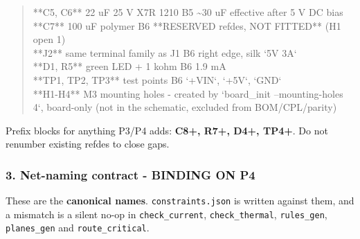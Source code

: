 \documentclass[11pt,a4paper]{article}
\begin{document}
\begin{quote}
\textbar{} {*}{*}C5, C6{*}{*} \textbar{} 22 uF 25 V X7R 1210 \textbar{} B5 \textbar{} \textasciitilde{}30 uF effective after 5 V DC bias \textbar{}\\
\textbar{} {*}{*}C7{*}{*} \textbar{} 100 uF polymer \textbar{} B6 \textbar{} {*}{*}RESERVED refdes, NOT FITTED{*}{*} (H1 open 1) \textbar{}\\
\textbar{} {*}{*}J2{*}{*} \textbar{} same terminal family as J1 \textbar{} B6 \textbar{} right edge, silk `5V 3A` \textbar{}\\
\textbar{} {*}{*}D1, R5{*}{*} \textbar{} green LED + 1 kohm \textbar{} B6 \textbar{} 1.9 mA \textbar{}\\
\textbar{} {*}{*}TP1, TP2, TP3{*}{*} \textbar{} test points \textbar{} B6 \textbar{} `+VIN`, `+5V`, `GND` \textbar{}\\
\textbar{} {*}{*}H1-H4{*}{*} \textbar{} M3 mounting holes \textbar{} - \textbar{} created by `board\_init --mounting-holes 4`, board-only (not in the schematic, excluded from BOM/CPL/parity) \textbar{}
\end{quote}
Prefix blocks for anything P3/P4 adds: \textbf{C8+, R7+, D4+, TP4+}. Do not renumber existing refdes to close gaps.

\subsubsection*{3. Net-naming contract - BINDING ON P4}
These are the \textbf{canonical names}. \texttt{constraints.json} is written against them, and a mismatch is a silent no-op in \texttt{check\_current}, \texttt{check\_thermal}, \texttt{rules\_gen}, \texttt{planes\_gen} and \texttt{route\_critical}.
\end{document}
